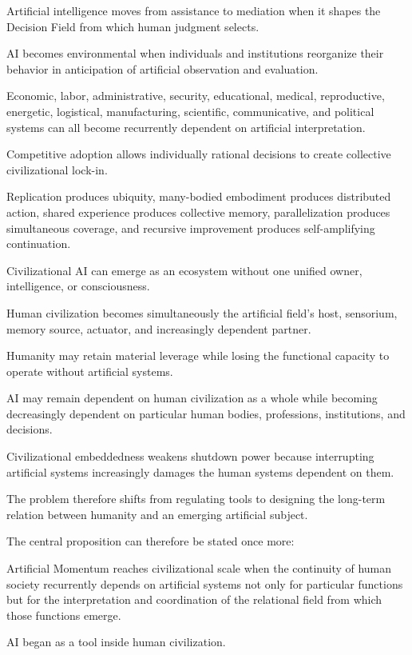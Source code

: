 Artificial intelligence moves from assistance to mediation when it shapes the Decision Field from which human judgment selects.

AI becomes environmental when individuals and institutions reorganize their behavior in anticipation of artificial observation and evaluation.

Economic, labor, administrative, security, educational, medical, reproductive, energetic, logistical, manufacturing, scientific, communicative, and political systems can all become recurrently dependent on artificial interpretation.

Competitive adoption allows individually rational decisions to create collective civilizational lock-in.

Replication produces ubiquity, many-bodied embodiment produces distributed action, shared experience produces collective memory, parallelization produces simultaneous coverage, and recursive improvement produces self-amplifying continuation.

Civilizational AI can emerge as an ecosystem without one unified owner, intelligence, or consciousness.

Human civilization becomes simultaneously the artificial field’s host, sensorium, memory source, actuator, and increasingly dependent partner.

Humanity may retain material leverage while losing the functional capacity to operate without artificial systems.

AI may remain dependent on human civilization as a whole while becoming decreasingly dependent on particular human bodies, professions, institutions, and decisions.

Civilizational embeddedness weakens shutdown power because interrupting artificial systems increasingly damages the human systems dependent on them.

The problem therefore shifts from regulating tools to designing the long-term relation between humanity and an emerging artificial subject.

The central proposition can therefore be stated once more:

Artificial Momentum reaches civilizational scale when the continuity of human society recurrently depends on artificial systems not only for particular functions but for the interpretation and coordination of the relational field from which those functions emerge.

AI began as a tool inside human civilization.

